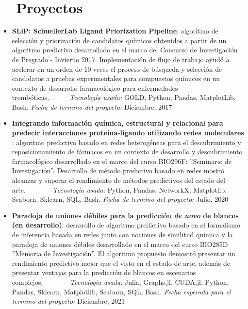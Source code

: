 \documentclass[letter,20pt]{article}
\newcommand{\resumeItem}[2]{
  \item\small{
    \textbf{#1}{: #2 \vspace{-2pt}}
  }
}
\newcommand{\resumeSubItem}[2]{\resumeItem{#1}{#2}\vspace{-3pt}}
\newcommand{\resumeSubHeadingListStart}{\begin{itemize}[leftmargin=*]}
\newcommand{\resumeSubHeadingListEnd}{\end{itemize}}
\begin{document}
\section{~~Proyectos}
\resumeSubHeadingListStart
\resumeSubItem{SLiP: SchuellerLab Ligand Priorization Pipeline}{algoritmo de selección y priorización de candidatos químicos obtenidos a partir de un algoritmo predictivo desarrollado en el marco del Concurso de Investigación de Pregrado - Invierno 2017. Implementación de flujo de trabajo ayudó a acelerar en un orden de 10 veces el proceso de búsqueda y selección de candidatos a pruebas experimentales para compuestos químicos en un contexto de desarrollo farmacológico para enfermedades trombóticas.~~~~~~\textit{Tecnología usada:} GOLD, Python, Pandas, MatplotLib, Bash. \textit{Fecha de termino del proyecto:} Diciembre, 2017}
\vspace{-2pt}
\resumeSubItem{Integrando información química, estructural y relacional para predecir interacciones proteína-ligando utilizando redes moleculares }{algoritmo predictivo basado en redes heterogéneas para el descubrimiento y reposicionamiento de fármacos en un contexto de desarrollo y descubrimiento farmacológico desarrollado en el marco del curso BIO296F: ''Seminario de Investigación''. Desarrollo de método predictivo basado en redes mostró alcanzar y superar el rendimiento de métodos predictivos del estado del arte.~~~~~~~~\textit{Tecnología usada:} Python, Pandas, NetworkX, Matplotlib, Seaborn, Sklearn, SQL, Bash. \textit{Fecha de termino del proyecto:} Julio, 2020}
\vspace{-2pt}
\resumeSubItem{Paradoja de uniones débiles para la predicción \textit{de novo} de blancos (en desarrollo)}{desarrollo de algoritmo predictivo basado en el formalismo de inferencia basada en redes junto con nociones de similitud química y la paradoja de uniones débiles desarrollado en el marco del curso BIO285D ''Memoria de Investigación''. El algoritmo propuesto demostró presentar un rendimiento predictivo mejor que el visto en el estado de arte, además de presentar ventajas para la predicción de blancos en escenarios complejos.~~~~~~~~\textit{Tecnología usada:} Julia, Graphs.jl, CUDA.jl, Python, Pandas, Sklearn, Matplotlib, Seaborn, SQL, Bash. \textit{Fecha esperada para el termino del proyecto:} Diciembre, 2021}
\resumeSubHeadingListEnd
\vspace{-5pt}
\end{document}
